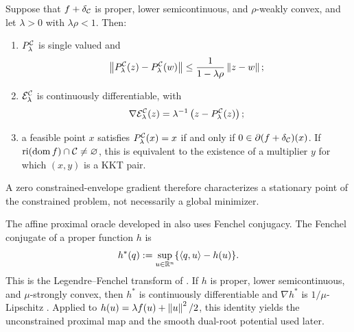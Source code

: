 \begin{lemma}
  \label{lem:safe-constrained-prox}
  Suppose that \(f+\delta_{\mathcal{C}}\) is proper, lower semicontinuous, and
  \(\rho\)-weakly convex, and let \(\lambda>0\) with \(\lambda\rho<1\).  Then:
  \begin{enumerate}[label=(\roman*)]
    \item \(P_\lambda^{\mathcal{C}}\) is single valued and
      \begin{equation}
        \left\lVert P_\lambda^{\mathcal{C}}(z)-P_\lambda^{\mathcal{C}}(w)\right\rVert
        \le
        \frac{1}{1-\lambda\rho}\left\lVert z-w\right\rVert;
        \label{eq:constrained-prox-lipschitz}
      \end{equation}
    \item \(\mathcal{E}_\lambda^{\mathcal{C}}\) is continuously differentiable, with
      \begin{equation}
        \nabla\mathcal{E}_\lambda^{\mathcal{C}}(z)
        =
        \lambda^{-1}
        \left(z-P_\lambda^{\mathcal{C}}(z)\right);
        \label{eq:constrained-envelope-gradient}
      \end{equation}
    \item a feasible point \(x\) satisfies
      \(P_\lambda^{\mathcal{C}}(x)=x\) if and only if
      \(0\in\partial(f+\delta_{\mathcal{C}})(x)\).  If
      \(\operatorname{ri}(\operatorname{dom}f)\cap\mathcal{C}\ne\varnothing\),
      this is equivalent to the existence of a multiplier \(y\) for which
      \((x,y)\) is a KKT pair.
  \end{enumerate}
\end{lemma}

A zero constrained-envelope gradient therefore characterizes a stationary
point of the constrained problem, not necessarily a global minimizer.

The affine proximal oracle developed in  also uses
Fenchel conjugacy.  The Fenchel conjugate of a proper function \(h\) is
\begin{equation}
  h^*(q):=\sup_{u\in\mathbb{R}^n}\{\left\langle q,u\right\rangle-h(u)\}.
  \label{eq:fenchel-conjugate}
\end{equation}
This is the Legendre--Fenchel transform of
\citet[Section~11.A]{RockafellarWets1998}.  If \(h\) is proper, lower
semicontinuous, and \(\mu\)-strongly convex, then \(h^*\) is continuously
differentiable and \(\nabla h^*\) is \(1/\mu\)-Lipschitz
\citep[Proposition~12.60]{RockafellarWets1998}.  Applied to
\(h(u)=\lambda f(u)+\left\lVert u\right\rVert^{2}/2\), this identity yields the unconstrained
proximal map and the smooth dual-root potential used later.

